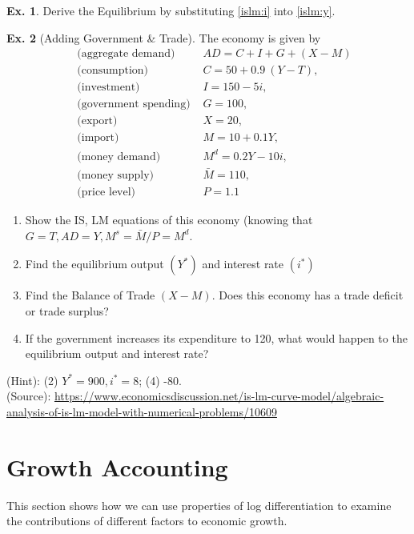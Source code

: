 \documentclass[10pt,a4paper]{book}
\theoremstyle{definition}\newtheorem{definition}{Definition}
\theoremstyle{definition}\newtheorem{fact}{Fact}
\theoremstyle{definition}\newtheorem{ex}{Ex.}
\theoremstyle{definition}\newtheorem{project}{Project}
\theoremstyle{definition}\newtheorem{problem}{Problem}
\theoremstyle{definition}\newtheorem{example}{Example}
\numberwithin{theorem}{chapter}
\numberwithin{corollary}{chapter}
\numberwithin{assumption}{chapter}
\numberwithin{definition}{chapter}
\numberwithin{prop}{chapter}
\numberwithin{notation}{chapter}
\numberwithin{problem}{chapter}
\numberwithin{example}{chapter}
\numberwithin{fact}{chapter}
\numberwithin{ex}{chapter}
\begin{document}
	
	
	\begin{ex}
		Derive the Equilibrium by substituting \eqref{islm:i} into \eqref{islm:y}. 
	\end{ex}
	
	\begin{ex}[Adding Government \& Trade]
		The economy is given by
		\begin{align*}
			& \text{ (aggregate demand) }    & AD = C + I + G + (X-M) \\
			& \text{ (consumption) }         & C = 50 + 0.9 \ (Y-T),  \\
			& \text{ (investment) }          & I = 150 - 5 i,         \\
			& \text{ (government spending) } & G = 100,               \\
			& \text{ (export) }              & X = 20,                \\
			& \text{ (import) }              & M = 10 + 0.1 Y,        \\
			& \text{ (money demand) }        & M^d = 0.2 Y - 10 i,    \\
			& \text{ (money supply) }        & \bar{M} = 110,         \\
			& \text{ (price level) }         & P = 1.1                
		\end{align*}
		\begin{enumerate}
			\item Show the IS, LM equations of this economy (knowing that $G=T, AD=Y, M^s = \bar{M}/P = M^d$.
			\item Find the equilibrium output $(Y^*)$ and interest rate $(i^*)$
			\item Find the Balance of Trade $(X-M)$. Does this economy has a trade deficit or trade surplus?
			\item If the government increases its expenditure to 120, what would happen to the equilibrium output and interest rate?
		\end{enumerate}
		(Hint): (2) $Y^*=900, i^*=8$; (4) -80. \\
		(Source): \href{https://www.economicsdiscussion.net/is-lm-curve-model/algebraic-analysis-of-is-lm-model-with-numerical-problems/10609}{https://www.economicsdiscussion.net/is-lm-curve-model/algebraic-analysis-of-is-lm-model-with-numerical-problems/10609}
	\end{ex}
	
	\section{Growth Accounting}
	This section shows how we can use properties of log differentiation to examine the contributions of different factors to economic growth.
	
\end{document}
